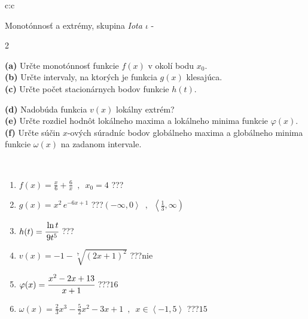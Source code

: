 \documentclass[10pt]{report}
\begin{document}
\newpage
\thispagestyle{empty}
\begin{tabular}{c:c}
\begin{minipage}[c][104.5mm][t]{0.5\linewidth}
\begin{center}
\vspace{7mm}
{\huge Monotónnosť a extrémy, skupina \textit{Iota $\iota$} -}\\[5mm]
\begin{minipage}{0.95\linewidth}
\begin{center}
{\small \begin{multicols}{2} \raggedright
\textbf{(a)} Určte monotónnosť funkcie \(f(x)\) v okolí bodu \(x_0\). \\[1mm]
\textbf{(b)} Určte intervaly, na ktorých je funkcia \(g(x)\) klesajúca. \\[1mm]
\textbf{(c)} Určte počet stacionárnych bodov funkcie \(h(t)\). \par \columnbreak
\textbf{(d)} Nadobúda funkcia \(v(x)\) lokálny extrém? \\[1mm]
\textbf{(e)} Určte rozdiel hodnôt lokálneho maxima a lokálneho minima funkcie \(\varphi(x)\). \\[1mm]
\textbf{(f)} Určte súčin \(x\)-ových súradníc bodov globálneho maxima a globálneho minima funkcie \(\omega(x)\) na zadanom intervale. \\[1mm]
\end{multicols}
}
\end{center}
\end{minipage}
\\[4mm]
\begin{minipage}{0.79\linewidth}
\begin{center}
\begin{varwidth}{\linewidth}
\begin{enumerate}
\normalsize
\item $f(x)=\frac{x}{6}+\frac{6}{x} \enspace , \enspace x_0=4$\quad \dotfill\; ???\;\dotfill \quad {}
\item $g(x)=x^2\, e^{-6x+1}$\quad \dotfill\; ???\;\dotfill \quad $\left(-\infty , 0\right\rangle\enspace , \enspace \left\langle\frac{1}{3} , \infty\right)$
\item $h(t)=\cfrac{\ln t}{9t^5}$\quad \dotfill\; ???\;\dotfill {}
\item $v(x)=-1-\sqrt[7]{(2x+1)^2}$\quad \dotfill\; ???\;\dotfill \quad $\text{nie}$
\item $\varphi(x)=\cfrac{x^2-2x+13}{x+1}$\quad \dotfill\; ???\;\dotfill \quad $16$
\item $\omega(x)=\frac{2}{3}x^3-\frac{5}{2}x^2-3x+1 \enspace , \enspace x\in\left\langle-1 , 5\right\rangle$\quad \dotfill\; ???\;\dotfill \quad $15$

\end{enumerate}
\end{varwidth}
\end{center}
\end{minipage}
\end{center}
\end{minipage}
\end{tabular}
\end{document}
